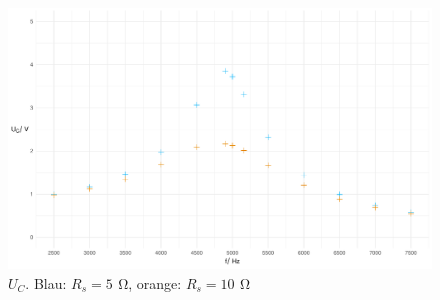 \documentclass[a4paper, 12pt]{article}
\begin{document}
    \begin{figure}[H]
      \begin{center}
      \includegraphics[scale=0.3819660112501051]{./R/3_5/3_5_UC.pdf}
      \caption*{ $U_C$. Blau: $R_s = 5 \,\ \si{\ohm}$, orange: $R_s = 10 \,\ \si{\ohm}$}
      \end{center}
    \end{figure}
\end{document}

